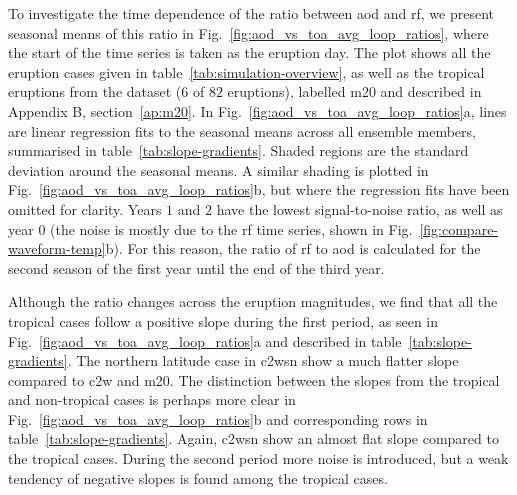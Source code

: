 \documentclass{ametsocV6.1}
\begin{document}
To investigate the time dependence of the ratio between \gls{aod} and \gls{rf}, we
present seasonal means of this ratio in Fig.~\ref{fig:aod_vs_toa_avg_loop_ratios},
where the start of the time series is taken as the eruption day. The plot shows all the
eruption cases given in table~\ref{tab:simulation-overview}, as well as the tropical
eruptions from the \citet{marshall2020dataset} dataset (\(6\) of \(82\) eruptions),
labelled \gls{m20} and described in Appendix B, section~\ref{ap:m20}. In
Fig.~\ref{fig:aod_vs_toa_avg_loop_ratios}a, lines are linear regression fits to the
seasonal means across all ensemble members, summarised in
table~\ref{tab:slope-gradients}. Shaded regions are the standard deviation around the
seasonal means. A similar shading is plotted in
Fig.~\ref{fig:aod_vs_toa_avg_loop_ratios}b, but where the regression fits have been
omitted for clarity. Years \(1\) and \(2\) have the lowest signal-to-noise ratio, as
well as year \(0\) (the noise is mostly due to the \gls{rf} time series, shown in
Fig.~\ref{fig:compare-waveform-temp}b). For this reason, the ratio of \gls{rf} to
\gls{aod} is calculated for the second season of the first year until the end of the
third year.

Although the ratio changes across the eruption magnitudes, we find that all the tropical
cases follow a positive slope during the first period, as seen in
Fig.~\ref{fig:aod_vs_toa_avg_loop_ratios}a and described in
table~\ref{tab:slope-gradients}. The northern latitude case in \gls{c2wsn} show a much
flatter slope compared to \gls{c2w} and \gls{m20}. The distinction between the slopes
from the tropical and non-tropical cases is perhaps more clear in
Fig.~\ref{fig:aod_vs_toa_avg_loop_ratios}b and corresponding rows in
table~\ref{tab:slope-gradients}. Again, \gls{c2wsn} show an almost flat slope compared
to the tropical cases. During the second period more noise is introduced, but a weak
tendency of negative slopes is found among the tropical cases.
\end{document}

